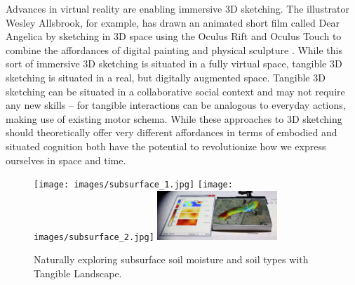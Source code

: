 \documentclass[prodmode,acmtochi]{acmsmall} %
\begin{document}

Advances in virtual reality are enabling immersive 3D sketching.
%
The illustrator
Wesley Allsbrook, %
for example, 
has drawn an animated short film called Dear Angelica
by sketching in 3D space using the Oculus Rift and Oculus Touch
to combine the affordances of digital painting and physical sculpture \cite{Oculus2016,Quilez2016}. 
%
While this sort of immersive 3D sketching is situated in a fully virtual space,
tangible 3D sketching is situated in a real, but digitally augmented space. 
%
Tangible 3D sketching
can be situated in a collaborative social context
and may not require any new skills -- 
for tangible interactions 
can be analogous to everyday actions, 
making use of existing motor schema.
%
While these approaches to 3D sketching 
should theoretically offer very different affordances
in terms of embodied and situated cognition
both have the potential to revolutionize how we 
express ourselves in space and time.

\begin{figure}
\begin{center}
		\texttt{[image: images/subsurface\_1.jpg]}
		\texttt{[image: images/subsurface\_2.jpg]}
		\includegraphics[height=70px]{images/subsurface_3.jpg}
	\caption{Naturally exploring subsurface soil moisture and soil types with Tangible Landscape.}
	\label{fig:subsurface}
\end{center}
\end{figure}
\end{document}
